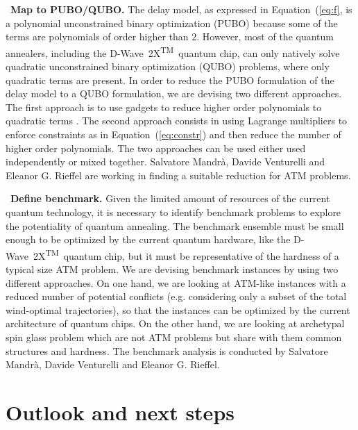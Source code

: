\documentclass[9pt]{extarticle}
\newcommand{\equationname}{Equation}
\newcommand{\DW}{\mbox{D-Wave 2X\textsuperscript{TM}}~}
\begin{document}
\begin{changemargin}{0.5cm}{0cm}
\textbullet~\textbf{Map to PUBO/QUBO.} The delay model, as expressed in \equationname~(\ref{eq:f}, is a polynomial unconstrained binary optimization (PUBO)
because some of the terms are polynomials of order higher than $2$.
However, most of the quantum annealers, including the \DW quantum chip, can only natively solve quadratic unconstrained binary optimization (QUBO) problems,
where only quadratic terms are present.
In order to reduce the PUBO formulation of the delay model to a QUBO formulation, we are devising two different approaches.
The first approach is to use gadgets to reduce higher order polynomials to quadratic terms \cite{babbush:13}. The second approach consists in using Lagrange multipliers \cite{ronagh:15} to enforce constraints as in \equationname~(\ref{eq:constr}) and then reduce the number of higher order polynomials. The two approaches can be used
either used independently or mixed together. Salvatore Mandr\`a, Davide Venturelli and Eleanor G. Rieffel are working in finding a suitable reduction for ATM problems.
\end{changemargin}

\begin{changemargin}{0.5cm}{0cm}
\textbullet~\textbf{Define benchmark.} Given the limited amount of resources of the current quantum technology, it is necessary to identify benchmark problems to
explore the potentiality of quantum annealing. The benchmark ensemble must be small enough to be optimized by the current quantum hardware, like the \DW quantum chip,
but it must be representative of the hardness of a typical size ATM problem. We are devising benchmark instances by using two different approaches. On one
hand, we are looking at ATM-like instances with a reduced number of potential conflicts (e.g. considering only a subset of the total wind-optimal trajectories),
so that the instances can be optimized by the current architecture of quantum chips. On the other hand, we are looking at archetypal spin glass problem \cite{venturelli:15a}
which are not ATM problems but share with them common structures and hardness. The benchmark analysis 
is conducted by Salvatore Mandr\`a, Davide Venturelli and Eleanor G. Rieffel.
\end{changemargin}

\section*{Outlook and next steps}\label{sec:ass}
\end{document}
